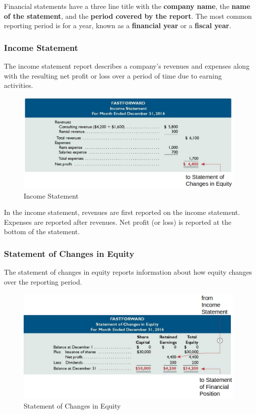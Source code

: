 \documentclass[../main.tex]{subfiles}
\begin{document}
	Financial statements have a three line title with the \textbf{company 
	name}, the 	\textbf{name of the statement}, and the \textbf{period covered 
	by the report}. The most common reporting period is for a year, known as a 
	\textbf{financial year} or a \textbf{fiscal year}. 
	
	\subsubsection{Income Statement}
	
	The income statement report describes a company's revenues and expenses 
	along with the resulting net profit or loss over a period of time due to 
	earning activities. 
	
	\begin{figure}[ht!]
		\centering
		\includegraphics[width=1\columnwidth]{images/c1/income_statement.png}
		\caption{Income Statement}
	\end{figure}
	
	In the income statement, revenues are first reported on the income 
	statement. Expenses are reported after revenues. Net profit (or loss) is 
	reported at the bottom of the statement. 
	
	\subsubsection{Statement of Changes in Equity}
	
	The statement of changes in equity reports information about how equity 
	changes over the reporting period. 
	
	\begin{figure}[ht!]
	\centering
	\includegraphics[width=1\columnwidth]{images/c1/financial_sce.png}
	\caption{Statement of Changes in Equity}
	\end{figure}
	
\end{document}
